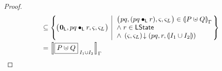 \begin{lemma}[Merge]
\begin{proof}
\[\begin{array}{r l}
	
	
	
	
	& 
	\subseteq \left\{
	\hspace*{-0.2cm}
	\begin{array}{l | l}
		\left(
		\hspace*{-0.15cm}
		\begin{array}{l}
		\unitL,
		pq \composeL r
		, \amod{}, \amod{L}
		\end{array}
		\hspace*{-0.15cm}
		\right)
		&
		\hspace*{-0.1cm}
		\begin{array}{l}
			\left(
			\hspace*{-0.15cm}
			\begin{array}{l}
				pq, 
				(pq \composeL r)
				, \amod{}, \amod{L}
			\end{array}
			\hspace*{-0.15cm}
			\right) \in \intermediateSem[\lenv]{P \sepish Q} \\
			

			
			\land\; r \in \LState \\
			\land\; \extendsAM{\amod{}, \amod{L}}{pq}{r}{\intermediateSemI{I_1 \cup I_2}}
		\end{array}
		\hspace*{-0.1cm}
	\end{array}
	\hspace*{-0.2cm}
	\right\} \vspace*{3pt}\\
	
	

	
	& = \sem[\lenv]{\shared{P \sepish Q}{I_1 \cup I_2}}
\end{array}
\]
%
\end{proof}
%
\end{lemma}
%
%


